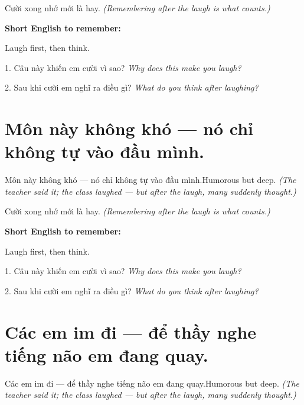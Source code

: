 \begin{baihoc}
Cười xong nhớ mới là hay.
\textit{(Remembering after the laugh is what counts.)}
\end{baihoc}

\begin{ghinhoanh}
\textbf{Short English to remember:}

Laugh first, then think.

\end{ghinhoanh}

\begin{tuhocnhanh}
1. Câu này khiến em cười vì sao? \textit{Why does this make you laugh?}

2. Sau khi cười em nghĩ ra điều gì? \textit{What do you think after laughing?}
\end{tuhocnhanh}
\ngancach


\section{Môn này không khó — nó chỉ không tự vào đầu mình.}
\begin{truyen}{Môn này không khó — nó chỉ không tự vào đầu mình.}{Humorous but deep.}
\textit{(The teacher said it; the class laughed — but after the laugh, many suddenly thought.)}
\end{truyen}

\begin{baihoc}
Cười xong nhớ mới là hay.
\textit{(Remembering after the laugh is what counts.)}
\end{baihoc}

\begin{ghinhoanh}
\textbf{Short English to remember:}

Laugh first, then think.

\end{ghinhoanh}

\begin{tuhocnhanh}
1. Câu này khiến em cười vì sao? \textit{Why does this make you laugh?}

2. Sau khi cười em nghĩ ra điều gì? \textit{What do you think after laughing?}
\end{tuhocnhanh}
\ngancach


\section{Các em im đi — để thầy nghe tiếng não em đang quay.}
\begin{truyen}{Các em im đi — để thầy nghe tiếng não em đang quay.}{Humorous but deep.}
\textit{(The teacher said it; the class laughed — but after the laugh, many suddenly thought.)}
\end{truyen}

